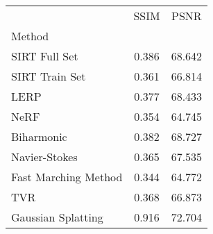 \begin{tabular}{|l|c|c|}
\toprule
 & SSIM & PSNR \\
Method &  &  \\
\midrule
SIRT Full Set & 0.386 & 68.642 \\
SIRT Train Set & 0.361 & 66.814 \\
LERP & \cellcolor{rankthird}0.377 & \cellcolor{rankthird}68.433 \\
NeRF & 0.354 & \cellcolor{rankworst}64.745 \\
Biharmonic & \cellcolor{ranksecond}0.382 & \cellcolor{ranksecond}68.727 \\
Navier-Stokes & 0.365 & 67.535 \\
Fast Marching Method & \cellcolor{rankworst}0.344 & 64.772 \\
TVR & 0.368 & 66.873 \\
Gaussian Splatting & \cellcolor{rankfirst}0.916 & \cellcolor{rankfirst}72.704 \\
\bottomrule
\end{tabular}
